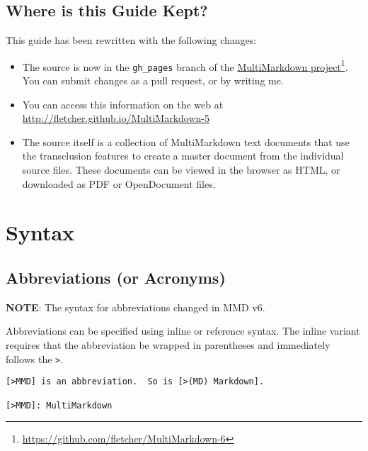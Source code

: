 \section{Where is this Guide Kept? }
\label{whereisthisguidekept}

This guide has been rewritten with the following changes:

\begin{itemize}
\item The source is now in the \texttt{gh\_pages} branch of the \href{https://github.com/fletcher/MultiMarkdown-6}{MultiMarkdown project}\footnote{\href{https://github.com/fletcher/MultiMarkdown-6}{https:\slash \slash github.com\slash fletcher\slash MultiMarkdown-6}}. You can submit changes as a pull request, or by writing me.

\item You can access this information on the web at \href{http://fletcher.github.io/MultiMarkdown-5}{http:\slash \slash fletcher.github.io\slash MultiMarkdown-5}

\item The source itself is a collection of MultiMarkdown text documents that use the transclusion features to create a master document from the individual source files. These documents can be viewed in the browser as HTML, or downloaded as PDF or OpenDocument files.

\end{itemize}

\chapter{Syntax }
\label{syntax}

\section{Abbreviations (or Acronyms)}
\label{abbreviationsoracronyms}

\textbf{NOTE}: The syntax for abbreviations changed in \gls{MMD} v6.

Abbreviations can be specified using inline or reference syntax. The inline variant requires that the abbreviation be wrapped in parentheses and immediately follows the \texttt{>}.

\begin{verbatim}
[>MMD] is an abbreviation.  So is [>(MD) Markdown].

[>MMD]: MultiMarkdown
\end{verbatim}

